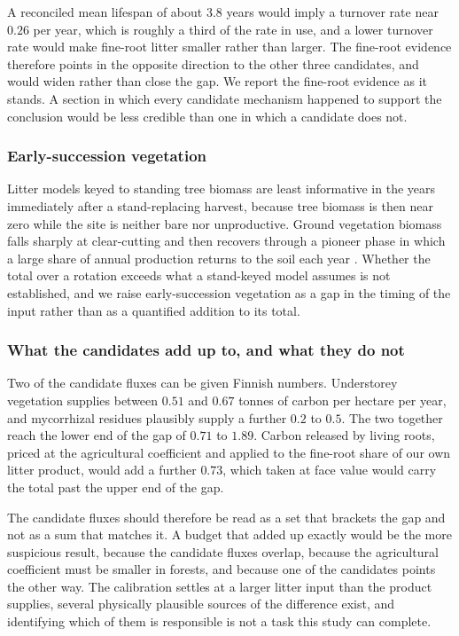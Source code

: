 \documentclass[11pt]{article}
\begin{document}
A reconciled mean lifespan of about $3.8$ years would imply a turnover rate near
$0.26$ per year, which is roughly a third of the rate in use, and a lower turnover
rate would make fine-root litter smaller rather than larger. The fine-root evidence
therefore points in the opposite direction to the other three candidates, and would
widen rather than close the gap. We report the fine-root evidence as it stands. A
section in which every candidate mechanism happened to support the conclusion would
be less credible than one in which a candidate does not.

\subsubsection{Early-succession vegetation}

Litter models keyed to standing tree biomass are least informative in the years
immediately after a stand-replacing harvest, because tree biomass is then near zero
while the site is neither bare nor unproductive. Ground vegetation biomass falls
sharply at clear-cutting and then recovers through a pioneer phase in which a large
share of annual production returns to the soil each year \citep{Palviainen2005}.
Whether the total over a rotation exceeds what a stand-keyed model assumes is not
established, and we raise early-succession vegetation as a gap in the timing of the
input rather than as a quantified addition to its total.

\subsubsection{What the candidates add up to, and what they do not}

Two of the candidate fluxes can be given Finnish numbers. Understorey vegetation
supplies between $0.51$ and $0.67$ tonnes of carbon per hectare per year, and
mycorrhizal residues plausibly supply a further $0.2$ to $0.5$. The two together
reach the lower end of the gap of $0.71$ to $1.89$. Carbon released by living roots,
priced at the agricultural coefficient and applied to the fine-root share of our own
litter product, would add a further $0.73$, which taken at face value would carry the
total past the upper end of the gap.

The candidate fluxes should therefore be read as a set that brackets the gap and not
as a sum that matches it. A budget that added up exactly would be the more suspicious
result, because the candidate fluxes overlap, because the agricultural coefficient
must be smaller in forests, and because one of the candidates points the other way.
The calibration settles at a larger litter input than the product supplies, several
physically plausible sources of the difference exist, and identifying which of them is
responsible is not a task this study can complete.
\end{document}
